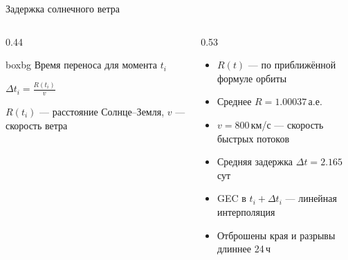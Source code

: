 \documentclass[aspectratio=169,11pt]{beamer}
\begin{document}
\begin{frame}[t]{Задержка солнечного ветра}
\begin{columns}[T,onlytextwidth]
\begin{column}[T]{0.44\textwidth}
  \begin{beamercolorbox}[wd=\linewidth,sep=3.5mm,rounded=true]{boxbg}
    {\color{muted}\footnotesize Время переноса для момента $t_i$}\par
    \vspace{1mm}
    {\large\color{navy}$\displaystyle \Delta t_i=\frac{R(t_i)}{v}$}\par
    \vspace{1mm}
    {\footnotesize\color{muted}$R(t_i)$ --- расстояние Солнце--Земля,
     $v$ --- скорость ветра}
  \end{beamercolorbox}
\end{column}
\begin{column}[T]{0.53\textwidth}
  {\footnotesize
  \begin{itemize}
    \item $R(t)$ --- по приближённой формуле орбиты
    \item Среднее $R=1.00037$\,а.е.
    \item $v=800$\,км/с --- скорость быстрых потоков
    \item Средняя задержка $\Delta t=2.165$\,сут
    \item GEC в $t_i+\Delta t_i$ --- линейная интерполяция
    \item Отброшены края и разрывы длиннее 24\,ч
  \end{itemize}}
\end{column}
\end{columns}

\vspace{2mm}
\begin{center}
\end{center}
\end{frame}
\end{document}
